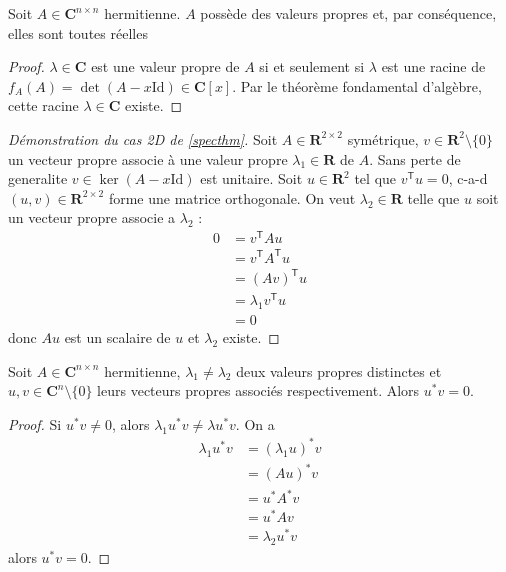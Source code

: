 \begin{proposition}
Soit $A\in \mathbf{C}^{n\times n}$ hermitienne. $A$ possède des valeurs propres et, par conséquence, elles sont toutes réelles
\end{proposition}
\begin{proof}
$\lambda \in \mathbf{C}$ est une valeur propre de $A$ si et seulement si $\lambda$ est une racine de $f_{A}(A)=\det(A-x\mathrm{Id})\in \mathbf{C}[x]$. Par le théorème fondamental d'algèbre, cette racine $\lambda \in \mathbf{C}$ existe.
\end{proof}
\begin{proof}[Démonstration du cas 2D de \ref{specthm}]
Soit $A\in \mathbf{R}^{2\times2}$ symétrique, $v\in \mathbf{R}^{2}\setminus \{ 0 \}$ un vecteur propre associe à une valeur propre $\lambda_{1} \in \mathbf{R}$ de $A$. Sans perte de generalite $v\in \ker(A-x\mathrm{Id})$ est unitaire. Soit $u\in \mathbf{R}^{2}$ tel que $v^{\mathsf{T}}u=0$, c-a-d $(u,v)\in \mathbf{R}^{2\times 2}$ forme une matrice orthogonale. On veut $\lambda_{2}\in \mathbf{R}$ telle que $u$ soit un vecteur propre associe a $\lambda_{2}$ :
\begin{align*}
0 & =v^{\mathsf{T}}Au \\
 & =v^{\mathsf{T}}A^{\mathsf{T}}u \\
 & =(Av)^{\mathsf{T}}u \\
 & =\lambda_{1}v^{\mathsf{T}}u \\
 & =0
\end{align*}
donc $Au$ est un scalaire de $u$ et $\lambda_{2}$ existe.
\end{proof}
\begin{lemma}
Soit $A\in \mathbf{C}^{n\times n}$ hermitienne, $\lambda_{1}\neq\lambda_{2}$ deux valeurs propres distinctes et $u,v\in \mathbf{C}^{n}\setminus \{ 0 \}$ leurs vecteurs propres associés respectivement. Alors $u^{*}v=0$.
\end{lemma}
\begin{proof}
Si $u^{*}v\neq 0$, alors $\lambda_{1}u^{*}v\neq\lambda u^{*}v$. On a
\begin{align*}
\lambda_{1}u^{*}v & =(\lambda_{1}u)^{*}v \\
 & =(Au)^{*}v \\
 & =u^{*}A^{*}v \\
 & =u^{*}Av \\
 & =\lambda_{2}u^{*}v
\end{align*}
alors $u^{*}v=0$.
\end{proof}
